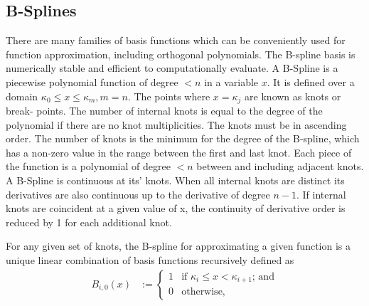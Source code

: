 \subsection{B-Splines}


There are many families of basis functions which can be conveniently used for
function approximation, including orthogonal polynomials. The B-spline basis
\citep{DeBoor1972} is numerically stable and efficient to computationally
evaluate. A B-Spline is a piecewise polynomial function of degree $< n$ in a
variable $x$. It is defined over a domain $\kappa_0 \leq x \leq \kappa_m, m=n$.
The points where $x = \kappa_j$ are known as knots or break- points. The number
of internal knots is equal to the degree of the polynomial if there are no knot
multiplicities. The knots must be in ascending order. The number of knots is the
minimum for the degree of the B-spline, which has a non-zero value in the range
between the first and last knot. Each piece of the function is a polynomial of
degree $< n$ between and including adjacent knots. A B-Spline is continuous at
its' knots. When all internal knots are distinct its derivatives are also
continuous up to the derivative of degree $n - 1$. If internal knots are
coincident at a given value of x, the continuity of derivative order is reduced
by 1 for each additional knot.

For any given set of knots, the B-spline for approximating a given function is a
unique linear combination of basis functions recursively defined as
$$
\begin{array}{rl}
	B_{i, 0}(x) & := \begin{cases}                                                                                                        
	1           & \text{if } \kappa_i \leq x < \kappa_{i+1} \text{; and}                                                                                         \\
	0           & \text{otherwise,}                                                                                                        
	\end{cases}
\end{array}
$$

